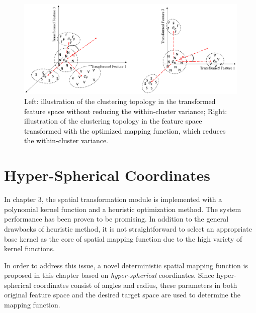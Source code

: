\begin{figure}[t]
\centering
\includegraphics[scale=.42]{Fig/topo2.png}
\caption{Left: illustration of the clustering topology in the \textcolor{black}{transformed feature space without reducing the within-cluster variance}; %
Right: illustration of the clustering topology in the \textcolor{black}{feature space transformed with the optimized mapping function, which reduces the within-cluster variance.}}%
\label{fig:topo2}
\end{figure}

\section{Hyper-Spherical Coordinates}

In chapter 3, the spatial transformation module is implemented with a polynomial kernel function and a heuristic optimization method. The system performance has been proven to be promising. In addition to the general drawbacks of heuristic method, it is not straightforward to select an appropriate base kernel as the core of spatial mapping function due to the high variety of kernel functions. %

In order to address this issue, a novel deterministic spatial mapping function is proposed in this chapter based on \textit{hyper-spherical} coordinates\cite{nsphere}. Since hyper-spherical coordinates consist of angles and radius, these parameters in both original feature space and the desired target space are used to determine the mapping function.


